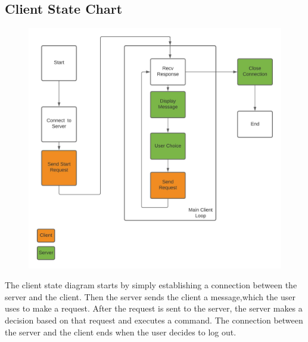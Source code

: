 \documentclass[11pt]{article}
\begin{document}
		\subsection*{Client State Chart}
			\begin{figure}[H]
				\centering
				\includegraphics[scale=0.5]{Client_State_Diagram}
				\label{fig:clientstatediagram}
			\end{figure}
		The client state diagram starts by simply establishing a connection between the server and the client. Then the server sends the client a message,which the user uses to make a request. After the request is sent to the server, the server makes a decision based on that request and executes a command. The connection between the server and the client ends when the user decides to log out.
\end{document}
